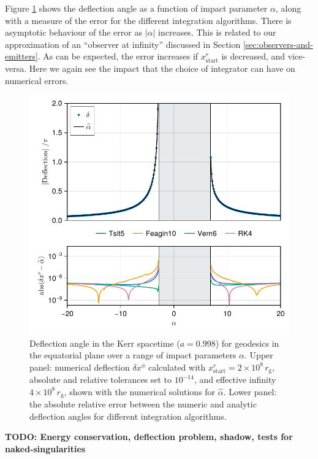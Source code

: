 \documentclass[fleqn,usenatbib]{mnras}
\newcommand{\todo}[1]{{\noindent \bf \color{red} TODO: #1}}
\newcommand{\rg}{r_\text{g}}
\begin{document}
Figure \ref{fig:deflection-angle} shows the deflection angle as a function of
impact parameter $\alpha$, along with a  measure of the error for the different
integration algorithms. There is asymptotic behaviour of the error as $\lvert
\alpha \rvert$ increases. This is related to our approximation of an ``observer
at infinity'' discussed in Section \ref{sec:observers-and-emitters}. As can be
expected, the error increases if $x^r_\text{start}$ is decreased, and
vice-versa. Here we again see the impact that the choice of integrator can have
on numerical errors.

\begin{figure}
	\centering
	\includegraphics[width=0.94\linewidth]{figures/deflection.iyer-hansen.pdf}
	\caption{Deflection angle in the Kerr spacetime ($a = 0.998$) for geodesics in the equatorial plane over a range of impact parameters $\alpha$. Upper panel: numerical deflection $\delta x^\phi$ calculated with  $x^r_\text{start} = 2 \times 10^8 \, \rg$, absolute and relative tolerances set to $10^{-14}$, and effective infinity $4 \times 10^8\, \rg$, shown with the numerical solutions for $\hat{\alpha}$. Lower panel: the absolute relative error between the numeric and analytic deflection angles for different integration algorithms.}
	\label{fig:deflection-angle}
\end{figure}


\todo{Energy conservation, deflection problem, shadow, tests for naked-singularities}
\end{document}
